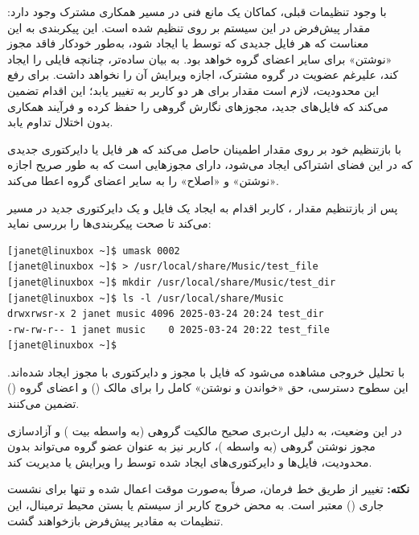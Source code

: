 با وجود تنظیمات قبلی، کماکان یک مانع فنی در مسیر همکاری مشترک وجود دارد: مقدار پیش‌فرض  در این سیستم بر روی  تنظیم شده است. این پیکربندی به این معناست که هر فایل جدیدی که توسط  یا  ایجاد شود، به‌طور خودکار فاقد مجوز «نوشتن» برای سایر اعضای گروه خواهد بود. به بیان ساده‌تر، چنانچه  فایلی را ایجاد کند،  علیرغم عضویت در گروه مشترک، اجازه ویرایش آن را نخواهد داشت. برای رفع این محدودیت، لازم است مقدار  برای هر دو کاربر به  تغییر یابد؛ این اقدام تضمین می‌کند که فایل‌های جدید، مجوزهای نگارش گروهی را حفظ کرده و فرآیند همکاری بدون اختلال تداوم یابد.

 با بازتنظیم  خود بر روی مقدار  اطمینان حاصل می‌کند که هر فایل یا دایرکتوری جدیدی که در این فضای اشتراکی ایجاد می‌شود، دارای مجوزهایی است که به طور صریح اجازه «نوشتن» و «اصلاح» را به سایر اعضای گروه  اعطا می‌کند.

پس از بازتنظیم مقدار ، کاربر  اقدام به ایجاد یک فایل و یک دایرکتوری جدید در مسیر  می‌کند تا صحت پیکربندی‌ها را بررسی نماید:

\begin{latin}
\begin{lstlisting}
[janet@linuxbox ~]$ umask 0002
[janet@linuxbox ~]$ > /usr/local/share/Music/test_file
[janet@linuxbox ~]$ mkdir /usr/local/share/Music/test_dir
[janet@linuxbox ~]$ ls -l /usr/local/share/Music
drwxrwsr-x 2 janet music 4096 2025-03-24 20:24 test_dir
-rw-rw-r-- 1 janet music    0 2025-03-24 20:22 test_file
[janet@linuxbox ~]$
\end{lstlisting}
\end{latin}

با تحلیل خروجی  مشاهده می‌شود که فایل  با مجوز  و دایرکتوری  با مجوز  ایجاد شده‌اند. این سطوح دسترسی، حق «خواندن و نوشتن» کامل را برای مالک () و اعضای گروه () تضمین می‌کنند.

در این وضعیت، به دلیل ارث‌بری صحیح مالکیت گروهی (به واسطه بیت ) و آزادسازی مجوز نوشتن گروهی (به واسطه )، کاربر  نیز به عنوان عضو گروه  می‌تواند بدون محدودیت، فایل‌ها و دایرکتوری‌های ایجاد شده توسط  را ویرایش یا مدیریت کند.

\begin{note}
\textbf{نکته:} تغییر  از طریق خط فرمان، صرفاً به‌صورت موقت اعمال شده و تنها برای نشست جاری () معتبر است. به محض خروج کاربر از سیستم یا بستن محیط ترمینال، این تنظیمات به مقادیر پیش‌فرض بازخواهند گشت.
\end{note}

